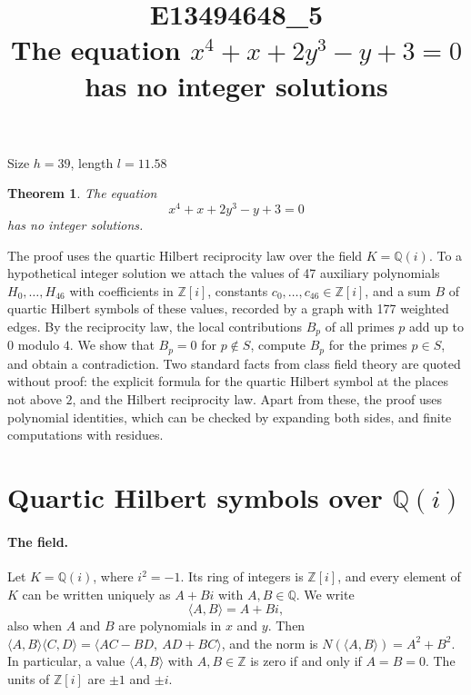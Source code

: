 \documentclass[11pt]{article}
\title{\textbf{E13494648\_5}\\[4pt] {\Large The equation $x^{4}+x+2y^{3}-y+3=0$ has no integer solutions}}
\author{}
\date{}
\newtheorem{theorem}{Theorem}
\newcommand{\Z}{\mathbb{Z}}
\newcommand{\Q}{\mathbb{Q}}
\begin{document}
\maketitle
\vspace{-8ex}
\begin{center}
Size $h=39$, length $l=11.58$
\end{center}

\begin{theorem}\label{thm:main}
The equation
\begin{equation}\label{eq:main}
x^{4}+x+2y^{3}-y+3=0
\end{equation}
has no integer solutions.
\end{theorem}

The proof uses the quartic Hilbert reciprocity law over the field $K=\Q(i)$. To a hypothetical integer solution we attach the values of 47 auxiliary polynomials $H_0,\dots,H_{46}$ with coefficients in $\Z[i]$, constants $c_0,\dots,c_{46}\in\Z[i]$, and a sum $B$ of quartic Hilbert symbols of these values, recorded by a graph with 177 weighted edges. By the reciprocity law, the local contributions $B_p$ of all primes $p$ add up to $0$ modulo $4$. We show that $B_p=0$ for $p\notin S$, compute $B_p$ for the primes $p\in S$, and obtain a contradiction. Two standard facts from class field theory are quoted without proof: the explicit formula for the quartic Hilbert symbol at the places not above $2$, and the Hilbert reciprocity law. Apart from these, the proof uses polynomial identities, which can be checked by expanding both sides, and finite computations with residues.


\section{\texorpdfstring{Quartic Hilbert symbols over $\Q(i)$}{Quartic Hilbert symbols over Q(i)}}\label{sec:symbols}

\paragraph{The field.} Let $K=\Q(i)$, where $i^2=-1$. Its ring of integers is $\Z[i]$, and every element of $K$ can be written uniquely as $A+Bi$ with $A,B\in\Q$. We write
\[
\langle A,B\rangle=A+Bi,
\]
also when $A$ and $B$ are polynomials in $x$ and $y$. Then $\langle A,B\rangle\langle C,D\rangle=\langle AC-BD,\ AD+BC\rangle$, and the norm is $N(\langle A,B\rangle)=A^2+B^2$. In particular, a value $\langle A,B\rangle$ with $A,B\in\Z$ is zero if and only if $A=B=0$. The units of $\Z[i]$ are $\pm1$ and $\pm i$.
\end{document}
